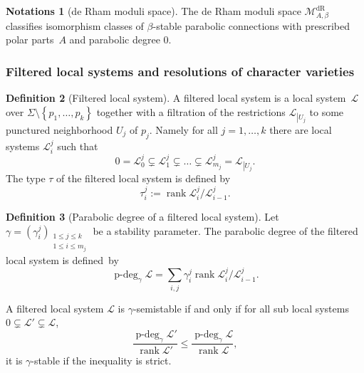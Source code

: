 \documentclass[11pt]{article}
\newcommand{\Subsubsection}{\subsubsection}
\newcommand{\dR}{\mathrm{dR}}
\theoremstyle{definition}
\newtheorem{definition}{Definition}[section]
\newtheorem{notations}[definition]{Notations}
\theoremstyle{plain}
\DeclareMathOperator{\rank}{rank}
\DeclareMathOperator{\pdeg}{p-deg}
\begin{document}
\begin{notations}[de Rham moduli space]
The de Rham moduli space $\mathcal{M}^{\dR}_{A,\beta}$ classifies isomorphism classes of $\beta$-stable parabolic connections with prescribed polar parts~$A$ and parabolic degree $0$.
\end{notations}

\Subsubsection{Filtered local systems and resolutions of character varieties}\label{subsect_resol_filtered_local}
\begin{definition}[Filtered local system]
A filtered local system is a local system~$\mathcal{L}$ over $\Sigma\setminus\left\lbrace p_1,\dots,p_k\right\rbrace$ together with a filtration of the restrictions $\mathcal{L}_{\left|U_j\right.}$ to some punctured neighborhood $U_j$ of $p_j$. Namely for all $j=1,\dots,k$ there are local systems $\mathcal{L}^j_i$ such that
\[
0 = \mathcal{L}^j_0 \subsetneq \mathcal{L}^j_1 \subsetneq \dots\subsetneq \mathcal{L}^j_{m_j} = \mathcal{L}_{\left|U_j\right.}.
\]
The type $\tau$ of the filtered local system is defined by
\[
\tau^j_i := \rank \mathcal{L}^j_i/ \mathcal{L}^j_{i-1}.
\]
\end{definition}

\begin{definition}[Parabolic degree of a filtered local system]
Let $\gamma =(\gamma^j_i)_{\substack{1\le j \le k \\ 1 \le i \le m_j}}$ be a stability parameter. The parabolic degree of the filtered local system is defined~by
\[
\pdeg_{\gamma} \mathcal{L} = \sum_{i,j} \gamma^j_i \rank \mathcal{L}^j_i / \mathcal{L}^j_{i-1}.
\]
\end{definition}

A filtered local system $\mathcal{L}$ is $\gamma$-semistable if and only if for all sub local systems $ 0 \subsetneq \mathcal{L}' \subsetneq \mathcal{L}$,
\[
\frac{\pdeg_{\gamma} \mathcal{L}'}{\rank \mathcal{L}'} \le \frac{\pdeg_{\gamma} \mathcal{L}}{\rank \mathcal{L}},
\]
it is $\gamma$-stable if the inequality is strict.
\end{document}

